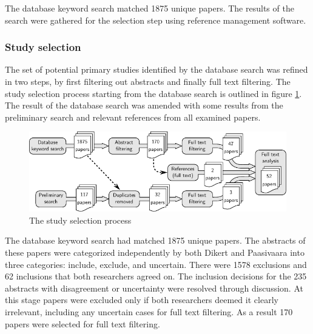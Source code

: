 The database keyword search matched 1875 unique papers. The results of the
search were gathered for the selection step using reference management software.


\subsubsection{Study selection}

The set of potential primary studies identified by the database search was
refined in two steps, by first filtering out abstracts and finally full text
filtering. The study selection process starting from the database search is
outlined in figure \ref{fig:selectionprocess_full}. The result of the database
search was amended with some results from the preliminary search and relevant
references from all examined papers.

\begin{figure}
  \begin{center}
    \includegraphics[width=1\textwidth]{graphics/research_process_full.pdf}
    \caption{The study selection process}
    \label{fig:selectionprocess_full}
  \end{center}
\end{figure}

The database keyword search had matched 1875 unique papers. The abstracts of
these papers were categorized independently by both Dikert and Paasivaara into
three categories: include, exclude, and uncertain. There were 1578 exclusions
and 62 inclusions that both researchers agreed on. The inclusion decisions
for the 235 abstracts with disagreement or uncertainty were resolved through
discussion. At this stage papers were excluded only if both researchers deemed
it clearly irrelevant, including any uncertain cases for full text filtering. As
a result 170 papers were selected for full text filtering.

%
%
%
%
%
%


